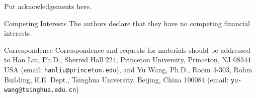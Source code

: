 \documentclass{nature}
\begin{document}





\begin{addendum}
 \item Put acknowledgements here.
 \item[Competing Interests] The authors declare that they have no
competing financial interests.
 \item[Correspondence] Correspondence and requests for materials should be
addressed to Han Liu, Ph.D., Sherred Hall 224, Princeton University, Princeton,
NJ 08544 USA (email: \texttt{hanliu@princeton.edu}), and Yu Wang, Ph.D., Room
4-303, Rohm Building, E.E. Dept., Tsinghua University, Beijing, China 100084
(email: \texttt{yu-wang@tsinghua.edu.cn})
\end{addendum}

	
\end{document}
